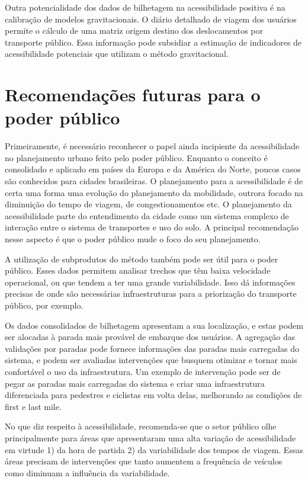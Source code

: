 \documentclass[        
    a4paper,          %
    12pt,             %
    chapter=TITLE,    %
    section=Title,    %
    subsection=Title, %
    oneside,          %
    english,          %
    spanish,          %
    brazil,           %
    fleqn             %
]{abntex2}
\begin{document}
  Outra potencialidade dos dados de bilhetagem na acessibilidade positiva é na calibração de modelos gravitacionais. O diário detalhado de viagem dos usuários permite o cálculo de uma matriz origem destino dos deslocamentos por transporte público. Essa informação pode subsidiar a estimação de indicadores de acessibilidade potenciais que utilizam o método gravitacional.
  
  \hypertarget{recomendacoes-futuras-para-o-poder-publico}{%
  \section{Recomendações futuras para o poder público}\label{recomendacoes-futuras-para-o-poder-publico}}
  
  Primeiramente, é necessário reconhecer o papel ainda incipiente da acessibilidade no planejamento urbano feito pelo poder público. Enquanto o conceito é consolidado e aplicado em países da Europa e da América do Norte, poucos casos são conhecidos para cidades brasileiras. O planejamento para a acessibilidade é de certa uma forma uma evolução do planejamento da mobilidade, outrora focado na diminuição do tempo de viagem, de congestionamentos etc. O planejamento da acessibilidade parte do entendimento da cidade como um sistema complexo de interação entre o sistema de transportes e uso do solo. A principal recomendação nesse aspecto é que o poder público mude o foco do seu planejamento.
  
  A utilização de subprodutos do método também pode ser útil para o poder público. Esses dados permitem analisar trechos que têm baixa velocidade operacional, ou que tendem a ter uma grande variabilidade. Isso dá informações precisas de onde são necessárias infraestruturas para a priorização do transporte público, por exemplo.
  
  Os dados consolidados de bilhetagem apresentam a sua localização, e estas podem ser alocadas à parada mais provável de embarque dos usuários. A agregação das validações por paradas pode fornece informações das paradas mais carregadas do sistema, e podem ser avaliadas intervenções que busquem otimizar e tornar mais confortável o uso da infraestrutura. Um exemplo de intervenção pode ser de pegar as paradas mais carregadas do sistema e criar uma infraestrutura diferenciada para pedestres e ciclistas em volta delas, melhorando as condições de first e last mile.
  
  No que diz respeito à acessibilidade, recomenda-se que o setor público olhe principalmente para áreas que apresentaram uma alta variação de acessibilidade em virtude 1) da hora de partida 2) da variabilidade dos tempos de viagem. Essas áreas precisam de intervenções que tanto aumentem a frequência de veículos como diminuam a influência da variabilidade.
  
	
\end{document}
